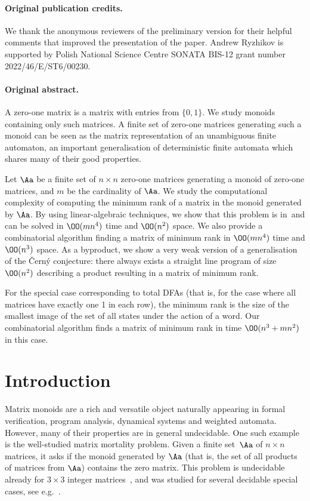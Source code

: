 \paragraph{Original publication credits.} We thank the anonymous reviewers of the preliminary version for their helpful comments that improved the presentation of the paper. Andrew Ryzhikov is supported by Polish National Science Centre SONATA BIS-12 grant
number 2022/46/E/ST6/00230.
\paragraph{Original abstract.} 
A zero-one matrix is a matrix with entries from $\{0, 1\}$. We study monoids containing only such matrices. A finite set of zero-one matrices generating such a monoid can be seen as the matrix representation of an unambiguous finite automaton, an important generalisation of deterministic finite automata which shares many of their good properties.

Let $\Aa$ be a finite set of $n \times n$ zero-one matrices generating a monoid of zero-one matrices, and $m$ be the cardinality of $\Aa$.
We study the computational complexity of computing the minimum rank of a matrix in the monoid generated by $\Aa$. By using linear-algebraic techniques, we show that this problem is in~\NC and can be solved in $\OO(mn^4)$ time and $\OO(n^2)$ space. We also provide a combinatorial algorithm finding a matrix of minimum rank in $\OO(mn^4)$ time and $\OO(n^3)$ space. As a byproduct, we show a very weak version of a generalisation of the \v{C}ern\'{y} conjecture: there always exists a straight line program of size $\OO(n^2)$ describing a product resulting in a matrix of minimum rank.

For the special case corresponding to total DFAs (that is, for the case where all matrices have exactly one 1 in each row), the minimum rank is the size of the smallest image of the set of all states under the action of a word. Our combinatorial algorithm finds a matrix of minimum rank in time $\OO(n^3 + mn^2)$ in this case.


\section{Introduction}\label{sec-intro}
Matrix monoids are a rich and versatile object naturally appearing in formal verification, program analysis, dynamical systems and weighted automata. 
However, many of their properties are in general undecidable. One such example is the well-studied matrix mortality problem. Given a finite set~$\Aa$ of $n \times n$ matrices, it asks if the monoid generated by $\Aa$ (that is, the set of all products of matrices from $\Aa$) contains the zero matrix. This problem is undecidable already for $3 \times 3$ integer matrices~\cite{Paterson1970}, and was studied for several decidable special cases, see e.g.~\cite{Cassaigne2014,Bell2021,Ryzhikov2024RP}.

